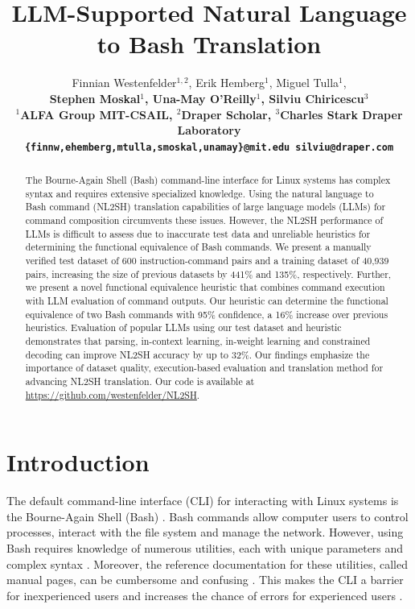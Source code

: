 \documentclass[11pt]{article}
\begin{document}
\title{{LLM}-{S}upported {N}atural {L}anguage to {B}ash {T}ranslation}
\author{
  Finnian Westenfelder$^{1,2}$, Erik Hemberg$^1$, Miguel Tulla$^1$,\\
  \bf Stephen Moskal$^1$, \bf Una-May O'Reilly$^1$, \bf Silviu Chiricescu$^3$\\
  $^1$ALFA Group MIT-CSAIL, $^2$Draper Scholar, $^3$Charles Stark Draper Laboratory\\
  \texttt{\{finnw,ehemberg,mtulla,smoskal,unamay\}@mit.edu silviu@draper.com}
}

\maketitle

\begin{abstract}
  The Bourne-Again Shell (Bash) command-line interface for Linux systems has complex syntax and requires extensive specialized knowledge. Using the natural language to Bash command (NL2SH) translation capabilities of large language models (LLMs) for command composition circumvents these issues. However, the NL2SH performance of LLMs is difficult to assess due to inaccurate test data and unreliable heuristics for determining the functional equivalence of Bash commands. We present a manually verified test dataset of 600 instruction-command pairs and a training dataset of 40,939 pairs, increasing the size of previous datasets by 441\% and 135\%, respectively. Further, we present a novel functional equivalence heuristic that combines command execution with LLM evaluation of command outputs. Our heuristic can determine the functional equivalence of two Bash commands with 95\% confidence, a 16\% increase over previous heuristics. Evaluation of popular LLMs using our test dataset and heuristic demonstrates that parsing, in-context learning, in-weight learning and constrained decoding can improve NL2SH accuracy by up to 32\%. Our findings emphasize the importance of dataset quality, execution-based evaluation and translation method for advancing NL2SH translation. Our code is available at \href{https://github.com/westenfelder/NL2SH}{https://github.com/westenfelder/NL2SH}.
\end{abstract}

\section{Introduction}
\label{sec:introduction}
The default command-line interface (CLI) for interacting with Linux systems is the Bourne-Again Shell (Bash) \cite{linux_cli_book}. Bash commands allow computer users to control processes, interact with the file system and manage the network. However, using Bash requires knowledge of numerous utilities, each with unique parameters and complex syntax \cite{Bash}. Moreover, the reference documentation for these utilities, called manual pages, can be cumbersome and confusing \cite{manpages}. This makes the CLI a barrier for inexperienced users and increases the chance of errors for experienced users \cite{NL2CMD-Comp}.
\end{document}
